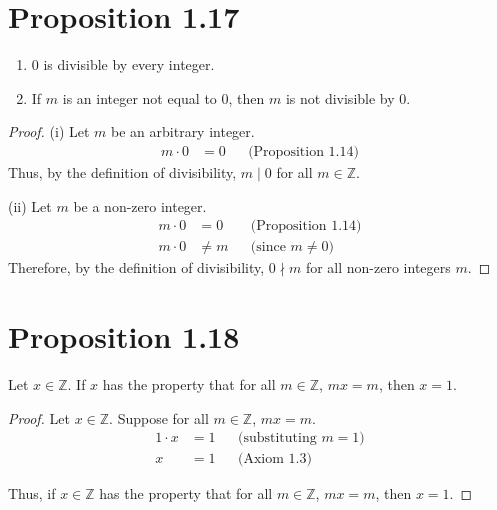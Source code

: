 \section*{Proposition 1.17}
\begin{enumerate}[label=(\roman*)]
    \item $0$ is divisible by every integer.
    \item If $m$ is an integer not equal to $0$, then $m$ is not divisible by $0$.
\end{enumerate}
\begin{proof}
    (i) Let $m$ be an arbitrary integer.
    \begin{align*}
        m \cdot 0 & = 0 &  & \text{(Proposition 1.14)}
    \end{align*}
    Thus, by the definition of divisibility, $m \mid 0$ for all $m \in \mathbb{Z}$.

    (ii) Let $m$ be a non-zero integer.
    \begin{align*}
        m \cdot 0 & = 0    &  & \text{(Proposition 1.14)} \\
        m \cdot 0 & \neq m &  & \text{(since $m \neq 0$)}
    \end{align*}
    Therefore, by the definition of divisibility, $0 \nmid m$ for all non-zero integers $m$.
\end{proof}

\section*{Proposition 1.18}
Let $x \in \mathbb{Z}$. If $x$ has the property that for all $m \in \mathbb{Z}$, $mx = m$, then $x=1$.
\begin{proof}
    Let $x \in \mathbb{Z}$. Suppose for all $m \in \mathbb{Z}$, $mx = m$.
    \begin{align*}
        1 \cdot x & = 1 &  & \text{(substituting $m = 1$)} \\
        x         & = 1 &  & \text{(Axiom 1.3)}
    \end{align*}

    Thus, if $x \in \mathbb{Z}$ has the property that for all $m \in \mathbb{Z}$, $mx = m$, then $x = 1$.
\end{proof}

